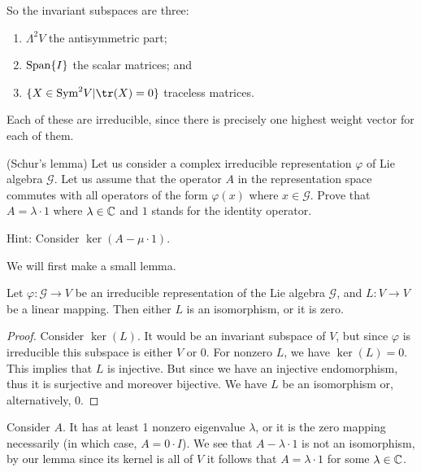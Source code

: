 So the invariant subspaces are three:
\begin{enumerate}
\item $\Lambda^{2}V$ the antisymmetric part;
\item ${\rm Span}\{I\}$ the scalar matrices; and
\item $\{X\in{\rm Sym}^{2}V|\tr(X)=0\}$ traceless matrices.
\end{enumerate}
Each of these are irreducible, since there is precisely one
highest weight vector for each of them.
\begin{exercise}
  (Schur's lemma) Let us consider a complex irreducible
  representation $\varphi$ of Lie algebra $\mathscr{G}$. Let us
  assume that the operator $A$ in the representation space
  commutes with all operators of the form $\varphi(x)$ where
  $x\in\mathscr{G}$. Prove that $A = \lambda\cdot 1$ where
  $\lambda\in\Bbb{C}$ and $1$ stands for the identity operator.


  Hint: Consider $\ker(A -\mu\cdot1)$.
\end{exercise}

\answer 
We will first make a small lemma.

\begin{lem}\label{lem:invertibility}
Let $\varphi\colon \mathscr{G}\to V$ be an irreducible
representation of the Lie algebra $\mathscr{G}$, and $L\colon
V\to V$ be a linear mapping. Then either $L$ is an isomorphism,
or it is zero.
\end{lem}
\begin{proof}
Consider $\ker(L)$. It would be an invariant subspace
of $V$, but since $\varphi$ is irreducible this subspace is
either $V$ or $0$. For nonzero $L$, we have $\ker(L)=0$. This
implies that $L$ is injective. But since we have an injective
endomorphism, thus it is surjective and moreover bijective. We have
$L$ be an isomorphism or, alternatively, 0.
\end{proof}

Consider $A$. It has at least 1 nonzero eigenvalue $\lambda$, or
it is the zero mapping necessarily (in which case, $A=0\cdot
I$). We see that $A-\lambda\cdot1$ is not an isomorphism, by our
lemma since its kernel is all of $V$ it follows that
$A=\lambda\cdot1$ for some $\lambda\in\Bbb{C}$.

